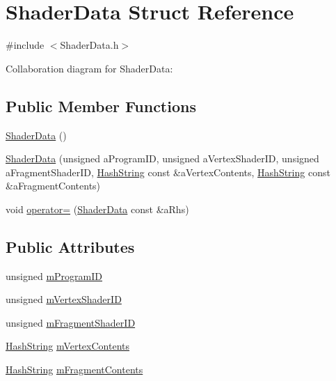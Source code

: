 \hypertarget{structShaderData}{}\section{Shader\+Data Struct Reference}
\label{structShaderData}


{\ttfamily \#include $<$Shader\+Data.\+h$>$}



Collaboration diagram for Shader\+Data\+:
\subsection*{Public Member Functions}
\begin{DoxyCompactItemize}
\item 
\hyperlink{structShaderData_a0bb7b6ad260260acedec9f69fa5d4b87}{Shader\+Data} ()
\item 
\hyperlink{structShaderData_a13d3611ac6d52aa12a88e8b731d20abe}{Shader\+Data} (unsigned a\+Program\+ID, unsigned a\+Vertex\+Shader\+ID, unsigned a\+Fragment\+Shader\+ID, \hyperlink{classHashString}{Hash\+String} const \&a\+Vertex\+Contents, \hyperlink{classHashString}{Hash\+String} const \&a\+Fragment\+Contents)
\item 
void \hyperlink{structShaderData_afade84d7486e8f67eda093b4f59882cb}{operator=} (\hyperlink{structShaderData}{Shader\+Data} const \&a\+Rhs)
\end{DoxyCompactItemize}
\subsection*{Public Attributes}
\begin{DoxyCompactItemize}
\item 
unsigned \hyperlink{structShaderData_a633e380befc5cabf68a16e1c32b7a236}{m\+Program\+ID}
\item 
unsigned \hyperlink{structShaderData_adf4a1030e9303fb8de7c88788c5b112e}{m\+Vertex\+Shader\+ID}
\item 
unsigned \hyperlink{structShaderData_a3320a31594b1aa4db9d06bc0f9dd627f}{m\+Fragment\+Shader\+ID}
\item 
\hyperlink{classHashString}{Hash\+String} \hyperlink{structShaderData_a7fb89e1c0ac26b3ea9178df7844f8d59}{m\+Vertex\+Contents}
\item 
\hyperlink{classHashString}{Hash\+String} \hyperlink{structShaderData_a17a7a167935376d8fddb665851e63324}{m\+Fragment\+Contents}
\end{DoxyCompactItemize}


